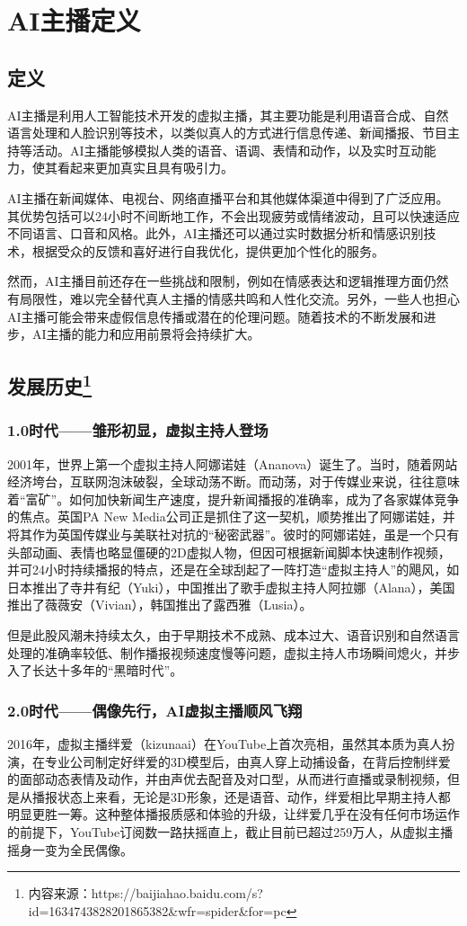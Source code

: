 \documentclass[11pt, a4paper, oneside]{ctexbook}
\begin{document}
\chapter{AI主播定义}
\section{定义}
AI主播是利用人工智能技术开发的虚拟主播，其主要功能是利用语音合成、自然语言处理和人脸识别等技术，以类似真人的方式进行信息传递、新闻播报、节目主持等活动。AI主播能够模拟人类的语音、语调、表情和动作，以及实时互动能力，使其看起来更加真实且具有吸引力。

AI主播在新闻媒体、电视台、网络直播平台和其他媒体渠道中得到了广泛应用。其优势包括可以24小时不间断地工作，不会出现疲劳或情绪波动，且可以快速适应不同语言、口音和风格。此外，AI主播还可以通过实时数据分析和情感识别技术，根据受众的反馈和喜好进行自我优化，提供更加个性化的服务。

然而，AI主播目前还存在一些挑战和限制，例如在情感表达和逻辑推理方面仍然有局限性，难以完全替代真人主播的情感共鸣和人性化交流。另外，一些人也担心AI主播可能会带来虚假信息传播或潜在的伦理问题。随着技术的不断发展和进步，AI主播的能力和应用前景将会持续扩大。

\section[发展历史]{发展历史\protect\footnote{内容来源：https://baijiahao.baidu.com/s?id=1634743828201865382\&wfr=spider\&for=pc}}
\subsection{1.0时代——雏形初显，虚拟主持人登场}
2001年，世界上第一个虚拟主持人阿娜诺娃（Ananova）诞生了。当时，随着网站经济垮台，互联网泡沫破裂，全球动荡不断。而动荡，对于传媒业来说，往往意味着“富矿”。如何加快新闻生产速度，提升新闻播报的准确率，成为了各家媒体竞争的焦点。英国PA New Media公司正是抓住了这一契机，顺势推出了阿娜诺娃，并将其作为英国传媒业与美联社对抗的“秘密武器”。彼时的阿娜诺娃，虽是一个只有头部动画、表情也略显僵硬的2D虚拟人物，但因可根据新闻脚本快速制作视频，并可24小时持续播报的特点，还是在全球刮起了一阵打造“虚拟主持人”的飓风，如日本推出了寺井有纪（Yuki），中国推出了歌手虚拟主持人阿拉娜（Alana），美国推出了薇薇安（Vivian），韩国推出了露西雅（Lusia）。

但是此股风潮未持续太久，由于早期技术不成熟、成本过大、语音识别和自然语言处理的准确率较低、制作播报视频速度慢等问题，虚拟主持人市场瞬间熄火，并步入了长达十多年的“黑暗时代”。
\subsection{2.0时代——偶像先行，AI虚拟主播顺风飞翔}
2016年，虚拟主播绊爱（kizunaai）在YouTube上首次亮相，虽然其本质为真人扮演，在专业公司制定好绊爱的3D模型后，由真人穿上动捕设备，在背后控制绊爱的面部动态表情及动作，并由声优去配音及对口型，从而进行直播或录制视频，但是从播报状态上来看，无论是3D形象，还是语音、动作，绊爱相比早期主持人都明显更胜一筹。这种整体播报质感和体验的升级，让绊爱几乎在没有任何市场运作的前提下，YouTube订阅数一路扶摇直上，截止目前已超过259万人，从虚拟主播摇身一变为全民偶像。
\end{document}
